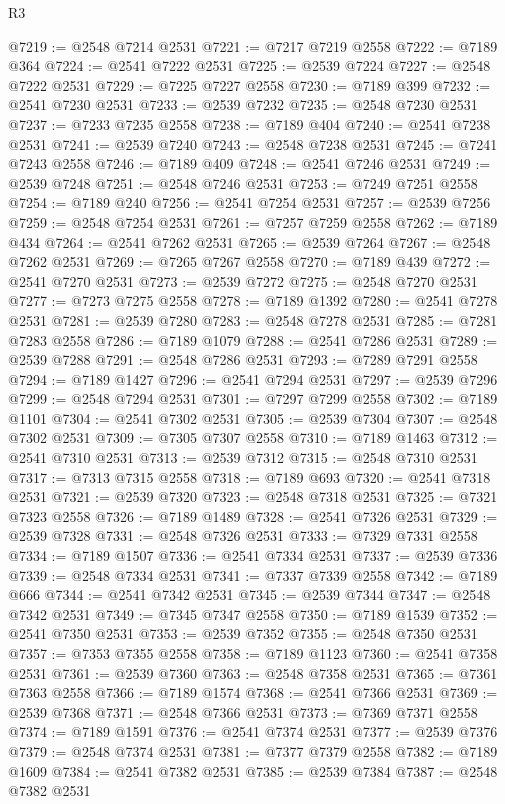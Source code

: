 \begin{lexlean}{R3}
\begin{coremodule}
@7219 := @2548 @7214 @2531
@7221 := @7217 @7219 @2558
@7222 := @7189 @364
@7224 := @2541 @7222 @2531
@7225 := @2539 @7224
@7227 := @2548 @7222 @2531
@7229 := @7225 @7227 @2558
@7230 := @7189 @399
@7232 := @2541 @7230 @2531
@7233 := @2539 @7232
@7235 := @2548 @7230 @2531
@7237 := @7233 @7235 @2558
@7238 := @7189 @404
@7240 := @2541 @7238 @2531
@7241 := @2539 @7240
@7243 := @2548 @7238 @2531
@7245 := @7241 @7243 @2558
@7246 := @7189 @409
@7248 := @2541 @7246 @2531
@7249 := @2539 @7248
@7251 := @2548 @7246 @2531
@7253 := @7249 @7251 @2558
@7254 := @7189 @240
@7256 := @2541 @7254 @2531
@7257 := @2539 @7256
@7259 := @2548 @7254 @2531
@7261 := @7257 @7259 @2558
@7262 := @7189 @434
@7264 := @2541 @7262 @2531
@7265 := @2539 @7264
@7267 := @2548 @7262 @2531
@7269 := @7265 @7267 @2558
@7270 := @7189 @439
@7272 := @2541 @7270 @2531
@7273 := @2539 @7272
@7275 := @2548 @7270 @2531
@7277 := @7273 @7275 @2558
@7278 := @7189 @1392
@7280 := @2541 @7278 @2531
@7281 := @2539 @7280
@7283 := @2548 @7278 @2531
@7285 := @7281 @7283 @2558
@7286 := @7189 @1079
@7288 := @2541 @7286 @2531
@7289 := @2539 @7288
@7291 := @2548 @7286 @2531
@7293 := @7289 @7291 @2558
@7294 := @7189 @1427
@7296 := @2541 @7294 @2531
@7297 := @2539 @7296
@7299 := @2548 @7294 @2531
@7301 := @7297 @7299 @2558
@7302 := @7189 @1101
@7304 := @2541 @7302 @2531
@7305 := @2539 @7304
@7307 := @2548 @7302 @2531
@7309 := @7305 @7307 @2558
@7310 := @7189 @1463
@7312 := @2541 @7310 @2531
@7313 := @2539 @7312
@7315 := @2548 @7310 @2531
@7317 := @7313 @7315 @2558
@7318 := @7189 @693
@7320 := @2541 @7318 @2531
@7321 := @2539 @7320
@7323 := @2548 @7318 @2531
@7325 := @7321 @7323 @2558
@7326 := @7189 @1489
@7328 := @2541 @7326 @2531
@7329 := @2539 @7328
@7331 := @2548 @7326 @2531
@7333 := @7329 @7331 @2558
@7334 := @7189 @1507
@7336 := @2541 @7334 @2531
@7337 := @2539 @7336
@7339 := @2548 @7334 @2531
@7341 := @7337 @7339 @2558
@7342 := @7189 @666
@7344 := @2541 @7342 @2531
@7345 := @2539 @7344
@7347 := @2548 @7342 @2531
@7349 := @7345 @7347 @2558
@7350 := @7189 @1539
@7352 := @2541 @7350 @2531
@7353 := @2539 @7352
@7355 := @2548 @7350 @2531
@7357 := @7353 @7355 @2558
@7358 := @7189 @1123
@7360 := @2541 @7358 @2531
@7361 := @2539 @7360
@7363 := @2548 @7358 @2531
@7365 := @7361 @7363 @2558
@7366 := @7189 @1574
@7368 := @2541 @7366 @2531
@7369 := @2539 @7368
@7371 := @2548 @7366 @2531
@7373 := @7369 @7371 @2558
@7374 := @7189 @1591
@7376 := @2541 @7374 @2531
@7377 := @2539 @7376
@7379 := @2548 @7374 @2531
@7381 := @7377 @7379 @2558
@7382 := @7189 @1609
@7384 := @2541 @7382 @2531
@7385 := @2539 @7384
@7387 := @2548 @7382 @2531

\end{coremodule}
\end{lexlean}
